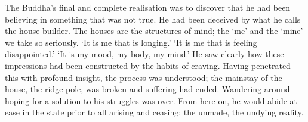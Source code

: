 \begin{dhpRefl}

The Buddha's final and complete realisation was to discover that he
had been believing in something that was not true. He had been
deceived by what he calls the house-builder. The houses are the
structures of mind; the `me' and the `mine' we take so seriously. `It
is me that is longing.' `It is me that is feeling disappointed.'  `It
is my mood, my body, my mind.'  He saw clearly how these impressions
had been constructed by the habits of craving. Having penetrated this
with profound insight, the process was understood; the mainstay of
the house, the ridge-pole, was broken and suffering had ended.
Wandering around hoping for a solution to his struggles was over.
From here on, he would abide at ease in the state prior to all
arising and ceasing; the unmade, the undying reality.

\end{dhpRefl}

